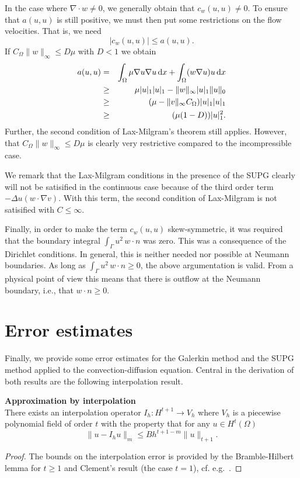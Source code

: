 In the case where $\nabla \cdot w \not = 0$, we generally obtain that $c_w(u,u) \not = 0$. 
To ensure that $a(u,u)$ is still positive, we must then put some restrictions on 
the flow velocities. That is, we need    
\[
|c_w(u,u)| \le a(u,u) .  
\]
If $C_\Omega \|w\|_\infty \le D \mu$ with $D < 1$ we obtain   
\begin{eqnarray*}
	a(u,u) &=& \int_\Omega\mu\nabla u\nabla u \, \mathrm{d}x + \int_\Omega (w\nabla u)u \, \mathrm{d}x\\
       &\ge & \mu |u|_1 |u|_1  - \|w\|_{\infty} |u|_1 \|u\|_0 \\   
       &\ge& (\mu - \|v\|_{\infty} C_\Omega )  |u|_1 |u|_1 \\    
       &\ge& (\mu (1-D))  |u|_1^2 .    
\end{eqnarray*}
Further, the second condition of Lax-Milgram's theorem still applies.   
However, that $C_\Omega \|w\|_\infty \le D \mu$ is clearly very restrictive 
compared to the incompressible case.   

We remark that the Lax-Milgram conditions in the presence of the SUPG clearly will not 
be satisified in the continuous case because of the third order term
$ -\Delta u (w\cdot\nabla v)$. With this term, the second condition of Lax-Milgram is not satisified
with $C \le \infty$.  

Finally, in order to make the  
term $c_w(u,u)$ skew-symmetric, it was required that 
the boundary integral $\int_\Gamma u^2 \, w  \cdot n $ was zero.  
This was a consequence of the Dirichlet conditions. 
 In general, this is neither needed nor possible
at Neumann boundaries. As long as $\int_\Gamma u^2 \, w \cdot n \ge 0 $, the above argumentation is valid. From a 
physical point of view this means that there is outflow at the Neumann boundary, i.e., that $w\cdot n \ge 0$.  

\section{Error estimates}

Finally, we provide some error estimates for the
Galerkin method and the SUPG method applied to the
convection-diffusion equation. Central in the derivation
of both results are the following interpolation result.   


\begin{theorem}{\textbf{Approximation by interpolation}}\\
There exists an interpolation operator $I_h: H^{t+1} \rightarrow V_h$ 
where $V_h$ is a piecewise polynomial field of order $t$ with the property that   
for any $u\in H^t(\Omega)$ 
\[
\| u - I_h u \|_m \le  B h^{t+1-m} \|u\|_{t+1}  .  
\]
\end{theorem}
\begin{proof} %
The bounds on the interpolation error is provided by 
the Bramble-Hilbert lemma for $t\ge 1$  and Clement's result (the case $t=1$), 
cf. e.g.~\cite{braess2007finite, brenner2008mathematical}.  
\end{proof}


